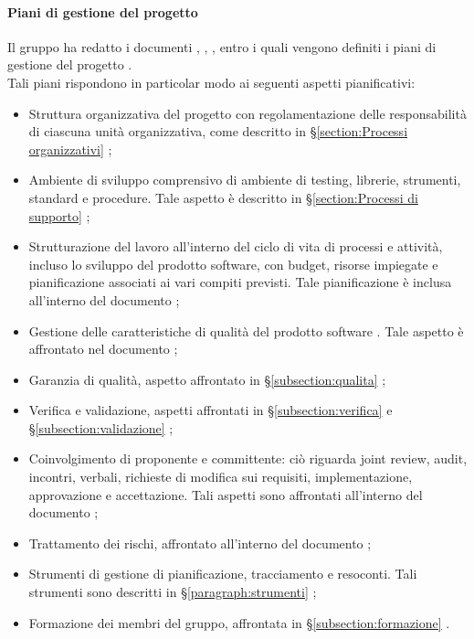 \paragraph{Piani di gestione del progetto}
Il gruppo \groupName{} ha redatto i documenti \docNameVersionNdP{}, \docNameVersionPdP{}, \docNameVersionPdQ{}, entro i quali vengono definiti i piani di gestione del progetto \projectName{}.\\
Tali piani rispondono in particolar modo ai seguenti aspetti pianificativi:
\begin{itemize}
	\item Struttura organizzativa del progetto con regolamentazione delle responsabilità di ciascuna unità organizzativa, come descritto in §\ref{section:Processi organizzativi} ;
	\item Ambiente di sviluppo comprensivo di ambiente di testing, librerie, strumenti, standard e procedure. Tale aspetto è descritto in §\ref{section:Processi di supporto} ;
	\item Strutturazione del lavoro all'interno del ciclo di vita di processi e attività, incluso lo sviluppo del prodotto software, con budget, risorse impiegate e pianificazione associati ai vari compiti previsti. Tale pianificazione è inclusa all'interno del documento \docNameVersionPdP{};
	\item Gestione delle caratteristiche di qualità del prodotto software \projectName{}. Tale aspetto è affrontato nel documento \docNameVersionPdQ{};
	\item Garanzia di qualità, aspetto affrontato in §\ref{subsection:qualita} ;
	\item Verifica e validazione, aspetti affrontati in §\ref{subsection:verifica}  e §\ref{subsection:validazione} ;
	\item Coinvolgimento di proponente e committente: ciò riguarda joint review, audit, incontri, verbali, richieste di modifica sui requisiti, implementazione, approvazione e accettazione. Tali aspetti sono affrontati all'interno del documento \docNameVersionNdP{};
	\item Trattamento dei rischi, affrontato all'interno del documento \docNameVersionPdP{};
	\item Strumenti di gestione di pianificazione, tracciamento e resoconti. Tali strumenti sono descritti in §\ref{paragraph:strumenti} ;
	\item Formazione dei membri del gruppo, affrontata in §\ref{subsection:formazione} .
\end{itemize}
